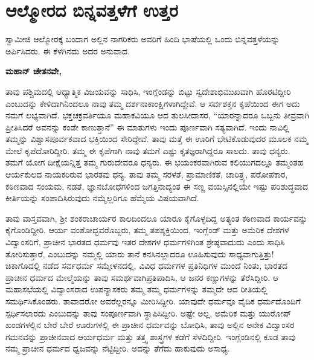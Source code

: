 
\chapter{ಆಲ್ಮೋರದ ಬಿನ್ನವತ್ತಳೆಗೆ ಉತ್ತರ}

ಸ್ವಾಮೀಜಿ ಆಲ್ಮೋರಕ್ಕೆ ಬಂದಾಗ ಅಲ್ಲಿನ ನಾಗರಿಕರು ಅವರಿಗೆ ಹಿಂದಿ ಭಾಷೆಯಲ್ಲಿ ಒಂದು ಬಿನ್ನವತ್ತಳೆಯನ್ನು ಅರ್ಪಿಸಿದರು. ಈ ಕೆಳಗಿನದು ಅದರ ಅನುವಾದ. 

\textbf{ಮಹಾನ್​ ಚೇತನವೇ, }

ತಾವು ಪಶ್ಚಿಮದಲ್ಲಿ ಆಧ್ಯಾತ್ಮಿಕ ವಿಜಯವನ್ನು ಸಾಧಿಸಿ, ಇಂಗ್ಲೆಂಡನ್ನು ಬಿಟ್ಟು ಸ್ವದೇಶಾಭಿಮುಖವಾಗಿ ಹೊರಟಿದ್ದೀರಿ ಎಂಬುದನ್ನು ಕೇಳಿದಾಗಿನಿಂದಲೂ ನಾವು ತಮ್ಮ ದರ್ಶನಾಕಾಂಕ್ಷಿಗಳಾಗಿದ್ದೇವೆ. ಆ ಸರ್ವಶಕ್ತನ ಕೃಪೆಯಿಂದ ಈಗ ಅದು ನಮಗೆ ಲಭ್ಯವಾಗಿದೆ. ಭಕ್ತಚಕ್ರವರ್ತಿಯೂ ಮಹಾಕವಿಯೂ ಆದ ತುಲಸೀದಾಸರ, “ಯಾರನ್ನಾದರೂ ಒಬ್ಬನು ತೀವ್ರವಾಗಿ ಪ್ರೀತಿಸಿದರೆ ಅವನನ್ನು ಕಂಡೇ ಕಾಣುತ್ತಾನೆ” ಈ ಮಾತುಗಳು ಇಂದು ಪೂರ್ಣವಾಗಿ ಸತ್ಯವಾಗಿದೆ. ಇಂದು ನಾವಿಲ್ಲಿ ತಮ್ಮನ್ನು ವಿಶ್ವಾಸಪೂರ್ವಕವಾದ ಭಕ್ತಿಯಿಂದ ಸೇರಿದ್ದೇವೆ. ತಾವು ಮತ್ತೆ ಈ ಊರಿಗೆ ಭೇಟಿಕೊಡುವುದರ ಮೂಲಕ ನಮ್ಮ ಮೇಲೆ ಕೃಪೆದೋರಿದ್ದೀರಿ. ತಮ್ಮ ಈ ಕೃಪೆಗಾಗಿ ನಾವು ತಮಗೆ ಎಷ್ಟು ಕೃತಜ್ಞರಾಗಿದ್ದರೂ ಸಾಲದು. ತಾವು ಧನ್ಯರು. ತಮಗೆ ಯೋಗ ದೀಕ್ಷೆಯನ್ನಿತ್ತ ತಮ್ಮ ಗುರುದೇವರೂ ಧನ್ಯರು. ಈ ಭಯಂಕರವಾಗಿರುವ ಕಲಿಯುಗದಲ್ಲೂ ತಮ್ಮಂತಹ ಆರ್ಯಕುಲದ ನಾಯಕರಿರುವ ಭಾರತವು ಧನ್ಯ. ತಾವು ತಮ್ಮ ಸರಳತೆ, ಪ್ರಾಮಾಣಿಕತೆ, ಚಾರಿತ್ರ್ಯ, ಪರೋಪಕಾರ, ಕಠಿಣವಾದ ಸಂಯಮ, ನಡತೆ, ಜ್ಞಾನಬೋಧೆಗಳಿಂದ ಜಗತ್ತಿನಾದ್ಯಂತ ಈ ಸಣ್ಣ ವಯಸ್ಸಿನಲ್ಲಿಯೇ ಇಷ್ಟು ಪರಿಶುದ್ಧವಾದ ಕೀರ್ತಿಯನ್ನು ಸಂಪಾದಿಸಿರುವುದು ನಮ್ಮೆಲ್ಲರಿಗೂ ಹೆಮ್ಮೆಯ ವಿಷಯವಾಗಿದೆ. 

ತಾವು ವಾಸ್ತವವಾಗಿ, ಶ‍್ರೀ ಶಂಕರಾಚಾರ್ಯರ ಕಾಲದಿಂದಲೂ ಯಾರೂ ಕೈಗೊಳ್ಳದಿದ್ದ ಅತ್ಯಂತ ಕಠಿಣವಾದ ಕಾರ್ಯವನ್ನು ಕೈಗೊಂಡಿದ್ದೀರಿ. ಆರ್ಯ ವಂಶೋದ್ಭವರೊಬ್ಬರು, ತಮ್ಮ ತಪಶ್ಶಕ್ತಿಯಿಂದ, ಇಂಗ್ಲೆಂಡ್​ ಮತ್ತು ಅಮೆರಿಕ ದೇಶಗಳ ವಿದ್ವಾಂಸರಿಗೆ, ಪ್ರಾಚೀನ ಭಾರತದ ಧರ್ಮವು ಇತರ ದೇಶಗಳ ಧರ್ಮಗಳಿಗಿಂತ ಶ್ರೇಷ್ಠವಾದುದು ಎಂದು ಸಾಧಿಸಿ ತೋರಿಸುತ್ತಾರೆ, ಎಂಬುದನ್ನು ನಮ್ಮಲ್ಲಿ ಯಾರು ತಾನೆ ಕನಸಿನಲ್ಲಾದರೂ ಊಹಿಸುವುದು ಸಾಧ್ಯವಾಗುತ್ತಿತ್ತು! ಚಿಕಾಗೊದಲ್ಲಿ ನಡೆದ ಸರ್ವಧರ್ಮ ಸಮ್ಮೇಳನದಲ್ಲಿ, ವಿವಿಧ ಧರ್ಮಗಳ ಪ್ರತಿನಿಧಿಗಳ ಮುಂದೆ ನಿಂತು, ಭಾರತದ ಪ್ರಾಚೀನ ಧರ್ಮದ ಮೇಲ್ಮೆಯನ್ನು ತಾವು ಸಮರ್ಥವಾಗಿ\break ಪ್ರತಿಪಾದಿಸಿ, ಆ ಜನರ ಕಣ್ಣುಗಳನ್ನು ತೆರೆಸಿದ್ದೀರಿ. ಆ ಮಹಾಸಭೆಯಲ್ಲಿ ವಿದ್ವಾಂಸರಾದ ಉಪನ್ಯಾಸಕರು ತಮ್ಮ ತಮ್ಮ ಧರ್ಮಗಳನ್ನು ತಮ್ಮದೇ ಆದ ರೀತಿಯಲ್ಲಿ ಸಮರ್ಥಿಸಿಕೊಂಡರು. ತಾವಾದರೋ ಅವರೆಲ್ಲರನ್ನೂ ಮೀರಿಸಿದ್ದೀರಿ. ಯಾವುದೇ ಧರ್ಮವೂ ವೈದಿಕ ಧರ್ಮದೊಂದಿಗೆ ಸ್ಪರ್ಧಿಸಲಾರದು ಎಂಬುದನ್ನು ತಾವು ಸಂಪೂರ್ಣವಾಗಿ ಸ್ಥಾಪಿಸಿದ್ದೀರಿ. ಅಷ್ಟೇ ಅಲ್ಲ, ಅಮೆರಿಕ ಮತ್ತು ಯುರೋಪ್​ ಖಂಡಗಳಲ್ಲಿನ ಬೇರೆ ಬೇರೆ ಊರುಗಳಲ್ಲಿ ಈ ಪ್ರಾಚೀನ ಧರ್ಮವನ್ನು ಬೋಧಿಸಿ, ತಾವು ಅಲ್ಲಿನ ಅನೇಕ ವಿದ್ವಾಂಸರ ಗಮನವನ್ನು ಪ್ರಾಚೀನವಾದ ಆರ್ಯಧರ್ಮ ಮತ್ತು ತತ್ತ್ವ ಶಾಸ್ತ್ರಗಳ ಕಡೆಗೆ ಸೆಳೆದಿದ್ದೀರಿ. ಇಂಗ್ಲೆಂಡಿನಲ್ಲಿ ಕೂಡ ತಾವು ನಮ್ಮ ಪ್ರಾಚೀನ ಧರ್ಮದ ಧ್ವಜವನ್ನು ನೆಟ್ಟಿದ್ದೀರಿ. ಅದನ್ನು ತೆಗೆದು ಹಾಕುವುದು ಅಸಾಧ್ಯ. 

